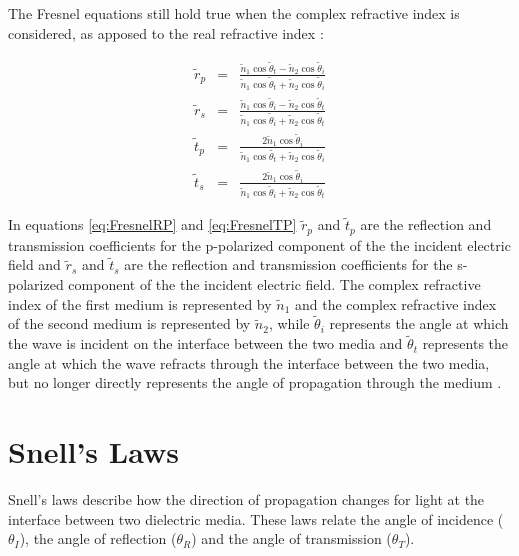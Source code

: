 The Fresnel equations still hold true when the complex refractive index is considered, as apposed to the  real refractive index \cite{Driscoll-1978}: 

\begin{eqnarray}
\widetilde{r}_{p} &=& \frac{\widetilde{n}_{1}\cos{\widetilde{\theta}_{t}} - \widetilde{n}_{2}\cos{\widetilde{\theta}_{i}}}{\widetilde{n}_{1}\cos{\widetilde{\theta}_{t}} + \widetilde{n}_{2}\cos{\widetilde{\theta}_{i}}}\label{eq:FresnelRP}\\
\widetilde{r}_{s} &=& \frac{\widetilde{n}_{1}\cos{\widetilde{\theta}_{i}} - \widetilde{n}_{2}\cos{\widetilde{\theta}_{t}}}{\widetilde{n}_{1}\cos{\widetilde{\theta}_{i}} + \widetilde{n}_{2}\cos{\widetilde{\theta}_{t}}}\label{eq:FresnelRS}\\
\widetilde{t}_{p} &=& \frac{2\widetilde{n}_{1}\cos{\widetilde{\theta}_{i}}}{\widetilde{n}_{1}\cos{\widetilde{\theta_{t}}} + \widetilde{n}_{2}\cos{\widetilde{\theta}_{i}}}\label{eq:FresnelTP}\\
\widetilde{t}_{s} &=& \frac{2\widetilde{n}_{1}\cos{\widetilde{\theta}_{i}}}{\widetilde{n}_{1}\cos{\widetilde{\theta}_{i}} + \widetilde{n}_{2}\cos{\widetilde{\theta}_{t}}}\label{eq:FresnelTS}
\end{eqnarray}

In equations \ref{eq:FresnelRP} and \ref{eq:FresnelTP} $\widetilde{r}_{p}$ and $\widetilde{t}_{p}$ are the reflection and transmission coefficients for the p-polarized component of the the incident electric field and $\widetilde{r}_{s}$ and $\widetilde{t}_{s}$ are the reflection and transmission coefficients for the s-polarized component of the the incident electric field. The complex refractive index of the first medium is represented by $\widetilde{n}_{1}$ and the complex refractive index of the second medium is represented by $\widetilde{n}_{2}$, while $\widetilde{\theta}_{i}$ represents the angle at which the wave is incident on the interface between the two media and $\widetilde{\theta}_{t}$ represents the angle at which the wave refracts through the interface between the two media, but no longer directly represents the angle of propagation through the medium \cite{Kovalenko-2001}.

\section{Snell's Laws}
\label{sec:Snell}
Snell's laws describe how the direction of propagation changes for light at the interface between two dielectric media. These laws relate the angle of incidence ($\theta_{I}$), the angle of reflection ($\theta_{R}$) and the angle of transmission ($\theta_{T}$).

